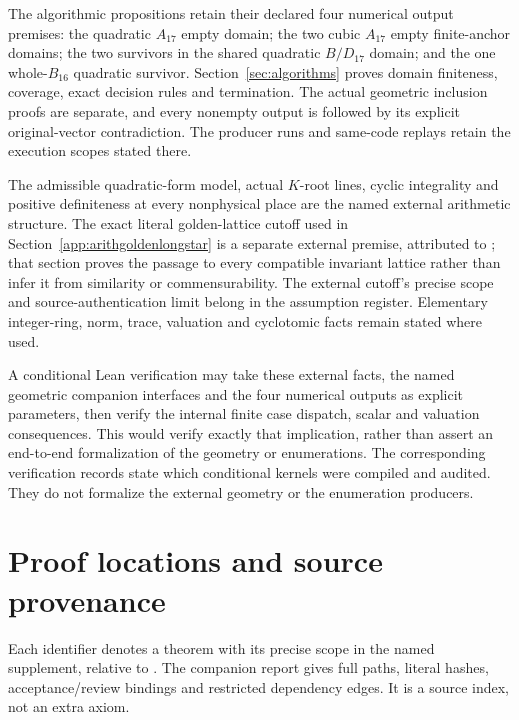 \documentclass[11pt]{article}
\begin{document}
The algorithmic propositions retain
their declared four numerical
output premises:
the quadratic \(A_{17}\) empty
domain; the two cubic \(A_{17}\)
empty finite-anchor domains; the
two survivors in the shared
quadratic \(B/D_{17}\) domain; and
the one whole-\(B_{16}\) quadratic
survivor.
Section~\ref{sec:algorithms}
proves domain finiteness, coverage,
exact decision rules and termination.
The actual geometric inclusion
proofs are separate, and every
nonempty output is followed by
its explicit original-vector
contradiction.
The producer runs and same-code replays retain the execution scopes
stated there.

The admissible quadratic-form
model, actual \(K\)-root lines,
cyclic integrality and positive
definiteness at every nonphysical
place are the named external
arithmetic structure.
The exact literal golden-lattice
cutoff used in
Section~\ref{app:arithgoldenlongstar}
is a separate external premise,
attributed to
\cite{BugaenkoGolden1984};
that section proves the passage
to every compatible invariant
lattice rather than infer it
from similarity or commensurability.
The external cutoff's precise
scope and source-authentication
limit belong in the assumption
register.
Elementary integer-ring, norm,
trace, valuation and cyclotomic
facts remain stated where used.

A conditional Lean verification
may take these external facts,
the named geometric companion
interfaces and the four numerical
outputs as explicit parameters,
then verify the internal finite
case dispatch, scalar and valuation
consequences.
This would verify exactly that
implication, rather than assert
an end-to-end formalization of
the geometry or enumerations.
The corresponding verification records state which conditional
kernels were compiled and audited. They do not formalize the external
geometry or the enumeration producers.

\section{Proof locations and source provenance}\label{app:sources}

Each identifier denotes a theorem with its precise scope in the
named supplement, relative to .
The companion report
gives full paths, literal hashes, acceptance/review bindings and
restricted dependency edges. It is a source index, not an extra axiom.
\end{document}
